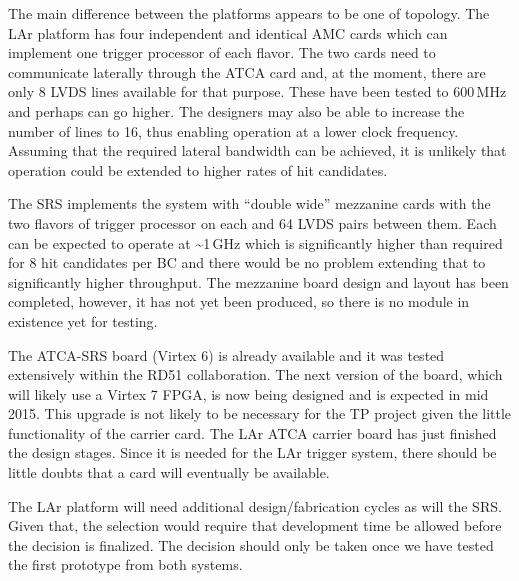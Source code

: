 The main difference between the platforms appears to be one of topology.
The LAr platform has four independent and identical AMC cards which can
implement one trigger processor of each flavor. The two cards need to
communicate laterally through the ATCA card and, at the moment, there
are only 8 LVDS lines available for that purpose. These have been tested
to 600\,MHz and perhaps can go higher. The designers may also be able to
increase the number of lines to 16, thus enabling operation at a lower
clock frequency. Assuming that the required lateral bandwidth can be
achieved, it is unlikely that operation could be extended to higher
rates of hit candidates.

The SRS implements the system with ``double wide'' mezzanine cards with the
two flavors of trigger processor on each and 64 LVDS pairs between them.
Each can be expected to operate at \textasciitilde{}1\,GHz which is
significantly higher than required for 8 hit candidates per BC and there
would be no problem extending that to significantly higher throughput.
The mezzanine board design and layout has been completed, however, it has not yet
been produced, so there is no module in existence yet for testing.

The ATCA-SRS board (Virtex 6) is already available and it was tested extensively within the RD51 collaboration. The next version of the board, which will likely use a Virtex 7 FPGA, is now being designed and is expected in mid 2015. This upgrade is not likely to be necessary for the TP project given the little functionality of the carrier card.
The LAr ATCA carrier board has just finished the design stages. Since it is needed for the LAr trigger system, there should be little doubts that a card will eventually be available.

The LAr platform will need additional design/fabrication
cycles as will the SRS. Given that, the selection would require that development time be
allowed before the decision is finalized. The decision should only be taken once we have tested the first prototype from both systems.

